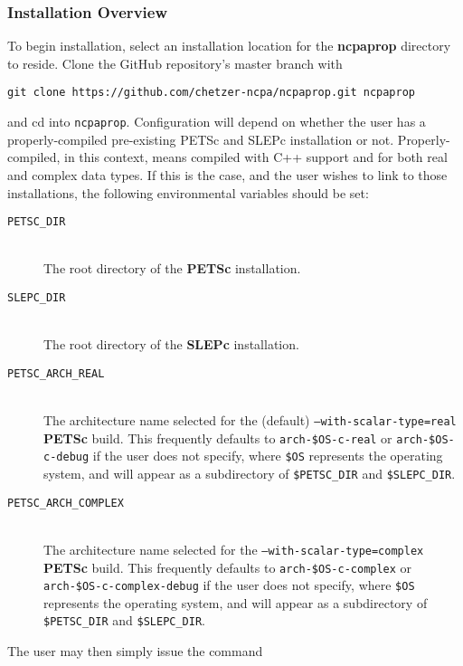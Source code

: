 \subsubsection{Installation Overview}

To begin installation, select an installation location for the \textbf{ncpaprop} directory to reside.  Clone the GitHub repository's master branch with

\texttt{git clone https://github.com/chetzer-ncpa/ncpaprop.git ncpaprop}

\noindent
and cd into \texttt{ncpaprop}.  Configuration will depend on whether the user has a properly-compiled pre-existing PETSc and SLEPc installation or not.  Properly-compiled, in this context, means compiled with C++ support and for both real and complex data types.  If this is the case, and the user wishes to link to those installations, the following environmental variables should be set:
\begin{description}
\item[\texttt{PETSC\_DIR}]\hfill \\
\noindent
The root directory of the \textbf{PETSc} installation.

\item[\texttt{SLEPC\_DIR}]\hfill \\
\noindent
The root directory of the \textbf{SLEPc} installation.

\item[\texttt{PETSC\_ARCH\_REAL}]\hfill \\
\noindent
The architecture name selected for the (default) \texttt{--with-scalar-type=real} \textbf{PETSc} build.  This frequently defaults to \texttt{arch-\$OS-c-real} or \texttt{arch-\$OS-c-debug} if the user does not specify, where \texttt{\$OS} represents the operating system, and will appear as a subdirectory of \texttt{\$PETSC\_DIR} and \texttt{\$SLEPC\_DIR}.

\item[\texttt{PETSC\_ARCH\_COMPLEX}]\hfill \\
\noindent
The architecture name selected for the \texttt{--with-scalar-type=complex} \textbf{PETSc} build.  This frequently defaults to \texttt{arch-\$OS-c-complex} or \texttt{arch-\$OS-c-complex-debug} if the user does not specify, where \texttt{\$OS} represents the operating system, and will appear as a subdirectory of \texttt{\$PETSC\_DIR} and \texttt{\$SLEPC\_DIR}.
\end{description}

The user may then simply issue the command

